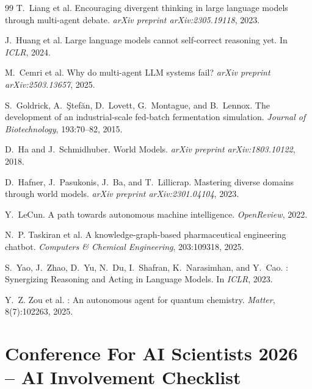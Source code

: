 \documentclass[11pt]{article}
\begin{document}
\begin{thebibliography}{99}
T.~Liang et al.
\newblock Encouraging divergent thinking in large language models through multi-agent debate.
\newblock \emph{arXiv preprint arXiv:2305.19118}, 2023.

J.~Huang et al.
\newblock Large language models cannot self-correct reasoning yet.
\newblock In \emph{ICLR}, 2024.

M.~Cemri et al.
\newblock Why do multi-agent LLM systems fail?
\newblock \emph{arXiv preprint arXiv:2503.13657}, 2025.

S.~Goldrick, A.~{\c{S}}tef{\u{a}}n, D.~Lovett, G.~Montague, and B.~Lennox.
\newblock The development of an industrial-scale fed-batch fermentation simulation.
\newblock \emph{Journal of Biotechnology}, 193:70--82, 2015.

D.~Ha and J.~Schmidhuber.
\newblock World Models.
\newblock \emph{arXiv preprint arXiv:1803.10122}, 2018.

D.~Hafner, J.~Pasukonis, J.~Ba, and T.~Lillicrap.
\newblock Mastering diverse domains through world models.
\newblock \emph{arXiv preprint arXiv:2301.04104}, 2023.

Y.~LeCun.
\newblock A path towards autonomous machine intelligence.
\newblock \emph{OpenReview}, 2022.

N.~P. Taskiran et al.
\newblock A knowledge-graph-based pharmaceutical engineering chatbot.
\newblock \emph{Computers \& Chemical Engineering}, 203:109318, 2025.

S.~Yao, J.~Zhao, D.~Yu, N.~Du, I.~Shafran, K.~Narasimhan, and Y.~Cao.
: Synergizing Reasoning and Acting in Language Models.
\newblock In \emph{ICLR}, 2023.

Y.~Z. Zou et al.
: An autonomous agent for quantum chemistry.
\newblock \emph{Matter}, 8(7):102263, 2025.
\end{thebibliography}

\appendix

\section*{Conference For AI Scientists 2026 -- AI Involvement Checklist}
\end{document}
